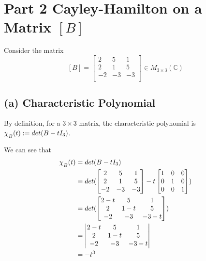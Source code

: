 \documentclass[12pt, letterpaper]{article}
\newcommand{\C}{\mathbb{C}}
\begin{document}
\section*{Part 2 \textmd{Cayley-Hamilton on a Matrix $[B]$}}

Consider the matrix
$$[B] = \begin{bmatrix}
2 & 5 & 1 \\
2 & 1 & 5 \\
-2 & -3 & -3 \\
\end{bmatrix} \in M_{3\times3}(\C)$$

\subsection*{(a) \textmd{Characteristic Polynomial}}

By definition, for a $3\times3$ matrix, the characteristic polynomial is $\chi_{\raisebox{-.5ex}{$\scriptstyle B$}}(t) := det(B-tI_3)$.

We can see that
\begin{align*}
		\chi_{\raisebox{-.5ex}{$\scriptstyle B$}}(t) &= det(B-tI_3) \\
			&= det(
			\begin{bmatrix}
			2 & 5 & 1 \\
			2 & 1 & 5 \\
			-2 & -3 & -3 \\
			\end{bmatrix} 
			- t
			\begin{bmatrix}
			1 & 0 & 0 \\
			0 & 1 & 0 \\
			0 & 0 & 1 \\
			\end{bmatrix} ) \\
			&= det(
			\begin{bmatrix}
			2- t & 5 & 1 \\
			2 & 1 - t & 5 \\
			-2 & -3 & -3 - t \\
			\end{bmatrix}
			) \\
			&= \begin{vmatrix}
			2- t & 5 & 1 \\
			2 & 1 - t & 5 \\
			-2 & -3 & -3 - t \\
			\end{vmatrix} \\
			&= -t^3
\end{align*}
\end{document}
